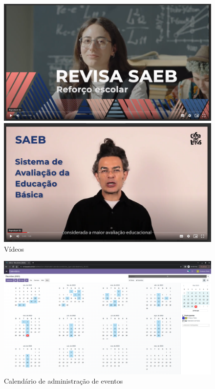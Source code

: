 \begin{figure}[H]
\includegraphics[width=\textwidth]{imgs/video1}\bigskip

\includegraphics[width=\textwidth]{imgs/video-2}
\caption{Vídeos}
\end{figure}



\begin{figure}[H]
\includegraphics[width=\textwidth]{imgs/calendario}
\caption{Calendário de administração de eventos}
\end{figure}


